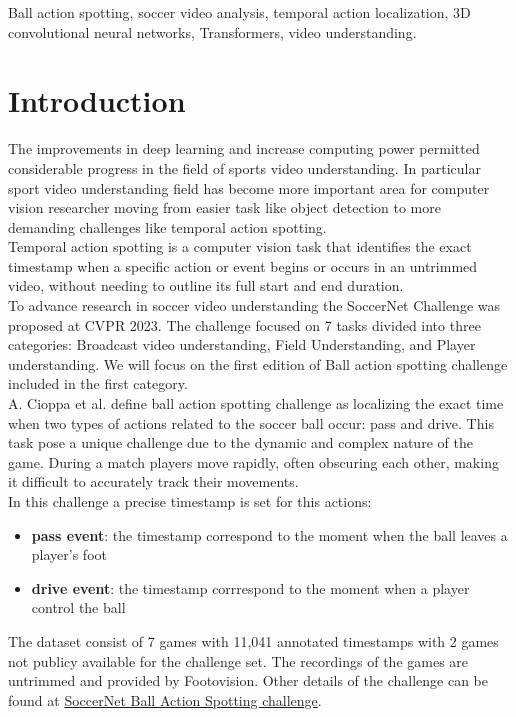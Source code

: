 \documentclass[conference]{IEEEtran}
\begin{document}
\begin{IEEEkeywords}
    Ball action spotting, soccer video analysis, temporal action localization, 3D convolutional neural networks, Transformers, video understanding.
\end{IEEEkeywords}

\section{Introduction}
The improvements in deep learning and increase computing power permitted considerable progress in the field of sports video understanding. In particular sport video understanding field has become more important area for computer vision researcher \cite{deliège2021soccernetv2datasetbenchmarksholistic} \cite{li2021multisportsmultipersonvideodataset} \cite{Giancola_2018} moving from easier task like object detection to more demanding challenges like temporal action spotting.\\
Temporal action spotting is a computer vision task that identifies the exact timestamp when a specific action or event begins or occurs in an untrimmed video, without needing to outline its full start and end duration.\\
To advance research in soccer video understanding the SoccerNet Challenge was proposed at CVPR 2023. The challenge focused on 7 tasks divided into three categories: Broadcast video understanding, Field Understanding, and Player understanding. We will focus on the first edition of Ball action spotting challenge included in the first category.\\
A. Cioppa et al. \cite{Cioppa_2024}  define ball action spotting challenge as localizing the exact time when two types of actions related to the soccer ball occur: pass and drive. This task pose a unique challenge due to the dynamic and complex nature of the game. During a match players move rapidly, often obscuring each other, making it difficult to accurately track their movements.\\
In this challenge a precise timestamp is set for this actions:
\begin{itemize}
    \item \textbf{pass event}: the timestamp correspond to the moment when the ball leaves a player's foot
    \item \textbf{drive event}: the timestamp corrrespond to the moment when a player control the ball
\end{itemize}
The dataset consist of 7 games with 11,041 annotated timestamps with 2 games not publicy available for the challenge set. The recordings of the games are untrimmed and provided by Footovision. Other details of the challenge can be found at \href{https://www.soccer-net.org/tasks/ball-action-spotting}{SoccerNet Ball Action Spotting challenge}.\\
\end{document}
